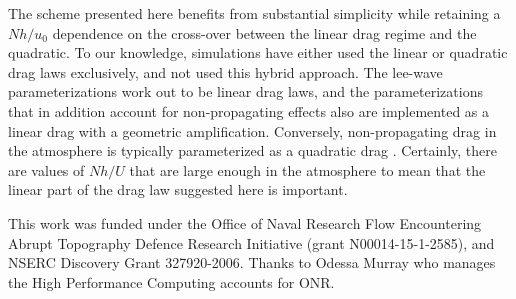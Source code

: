 \documentclass[twocol]{ametsocV5}
\newcommand{\tempS}[1]{}
\begin{document}



The scheme presented here benefits from substantial simplicity while retaining a $Nh/u_0$ dependence on the cross-over between the linear drag regime and the quadratic.  To our knowledge, simulations have either used the linear or quadratic drag laws exclusively, and not used this hybrid approach.  The lee-wave parameterizations \citep[i.e.][]{nikurashinferrari14} work out to be linear drag laws, and the parameterizations that in addition account for non-propagating effects \citep[][]{trossmanetal13, trossmanetal2016} also are implemented as a linear drag with a geometric amplification.  Conversely, non-propagating drag in the atmosphere is typically parameterized as a quadratic drag \citep{LottMiller97, ScinoccaMcFarlane00}.  Certainly, there are values of $Nh/U$ that are large enough in the atmosphere to mean that the linear part of the drag law suggested here is important.  


\acknowledgments

This work was funded under the Office of Naval Research Flow Encountering Abrupt Topography Defence Research Initiative (grant N00014-15-1-2585), and NSERC Discovery Grant 327920-2006.  Thanks to Odessa Murray who manages the High Performance Computing accounts for ONR.  
\end{document}
